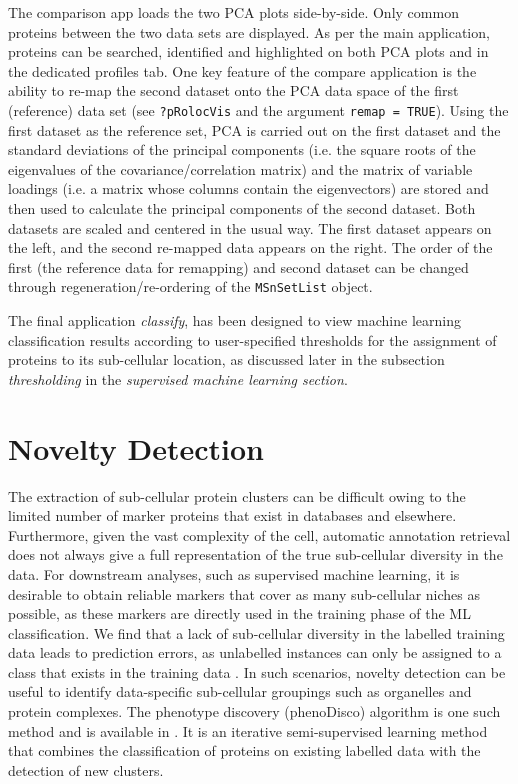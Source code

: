 The comparison app loads the two PCA plots side-by-side. Only common
proteins between the two data sets are displayed. As per the main
application, proteins can be searched, identified and highlighted on
both PCA plots and in the dedicated profiles tab. One key feature of
the compare application is the ability to re-map the second dataset
onto the PCA data space of the first (reference) data set (see
\texttt{?pRolocVis} and the argument \texttt{remap = TRUE}). Using the first dataset
as the reference set, PCA is carried out on the first dataset and the
standard deviations of the principal components (i.e. the square roots
of the eigenvalues of the covariance/correlation matrix) and the
matrix of variable loadings (i.e. a matrix whose columns contain the
eigenvectors) are stored and then used to calculate the principal
components of the second dataset. Both datasets are scaled and
centered in the usual way. The first dataset appears on the left, and
the second re-mapped data appears on the right. The order of the first
(the reference data for remapping) and second dataset can be changed
through regeneration/re-ordering of the \texttt{MSnSetList} object.

The final application \textit{classify}, has been designed to view
machine learning classification results according to user-specified
thresholds for the assignment of proteins to its sub-cellular
location, as discussed later in the subsection \textit{thresholding}
in the \textit{supervised machine learning section}.


\section*{Novelty Detection}

The extraction of sub-cellular protein clusters can be difficult owing
to the limited number of marker proteins that exist in databases and
elsewhere. Furthermore, given the vast complexity of the cell,
automatic annotation retrieval does not always give a full
representation of the true sub-cellular diversity in the data. For
downstream analyses, such as supervised machine learning, it is
desirable to obtain reliable markers that cover as many sub-cellular
niches as possible, as these markers are directly used in the training
phase of the ML classification. We find that a lack of sub-cellular
diversity in the labelled training data leads to prediction errors, as
unlabelled instances can only be assigned to a class that exists in
the training data \cite{Breckels:2013}. In such scenarios, novelty
detection can be useful to identify data-specific sub-cellular
groupings such as organelles and protein complexes. The phenotype
discovery (phenoDisco) algorithm \cite{Breckels:2013} is one such method
and is available in . It is an iterative
semi-supervised learning method that combines the classification of
proteins on existing labelled data with the detection of new clusters.

